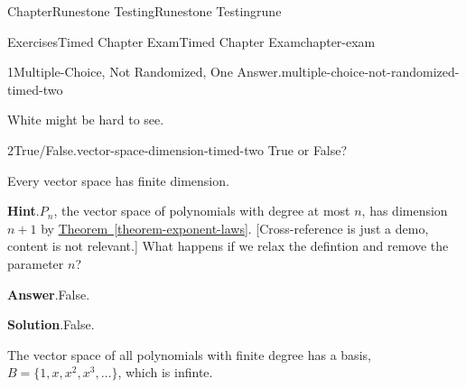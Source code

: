 \documentclass[oneside,10pt,]{book}
\newcommand{\blocktitlefont}{\relax}
\newcommand{\xreffont}{\relax}
\numberwithin{equation}{section}
\providecommand\phantomsection{}
\begin{document}
\begin{chapterptx}{Chapter}{Runestone Testing}{}{Runestone Testing}{}{}{rune}
\begin{exercises-section}{Exercises}{Timed Chapter Exam}{}{Timed Chapter Exam}{}{}{chapter-exam}
\begin{divisionexercise}{1}{Multiple-Choice, Not Randomized, One Answer.}{}{multiple-choice-not-randomized-timed-two}
\begin{enumerate}[label={\Alph*.}]
White might be hard to see.%
\end{enumerate}
%
\end{divisionexercise}%
\begin{divisionexercise}{2}{True\slash{}False.}{}{vector-space-dimension-timed-two}%
%
True or False?%
\par
Every vector space has finite dimension.%
\par\smallskip%
\noindent\textbf{\blocktitlefont Hint}.\hypertarget{vector-space-dimension-timed-two-4}{}\quad{}\(P_n\), the vector space of polynomials with degree at most \(n\), has dimension \(n+1\) by \hyperref[theorem-exponent-laws]{Theorem~{\xreffont\ref{theorem-exponent-laws}}}.  [Cross-reference is just a demo, content is not relevant.]  What happens if we relax the defintion and remove the parameter \(n\)?%
\par\smallskip%
\noindent\textbf{\blocktitlefont Answer}.\hypertarget{vector-space-dimension-timed-two-5}{}\quad{}False.%
\par\smallskip%
\noindent\textbf{\blocktitlefont Solution}.\hypertarget{vector-space-dimension-timed-two-6}{}\quad{}False.%
\par
The vector space of all polynomials with finite degree has a basis, \(B = \{1,x,x^2,x^3,\dots\}\), which is infinte.%
\end{divisionexercise}%
\end{exercises-section}
\end{chapterptx}
%
\appendix%
%
\clearpage\phantomsection%
%
%
%
\typeout{************************************************}
\typeout{************************************************}
%
\end{document}
